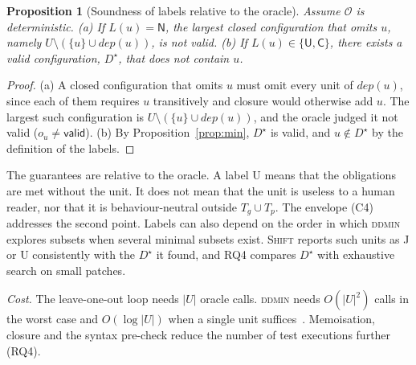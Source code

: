 \documentclass[a4paper,fleqn]{cas-sc}
\newcommand{\tool}{\textsc{Shift}}
\newcommand{\lab}[1]{\textsf{#1}}
\newtheorem{proposition}{Proposition}
\begin{document}
\begin{proposition}[Soundness of labels relative to the oracle]\label{prop:sound}
Assume $\mathcal{O}$ is deterministic. (a) If $L(u)=\lab{N}$, the largest closed configuration that omits $u$, namely $U\setminus(\{u\}\cup\mathit{dep}(u))$, is not valid. (b) If $L(u)\in\{\lab{U},\lab{C}\}$, there exists a valid configuration, $D^\star$, that does not contain $u$.
\end{proposition}
\begin{proof}
(a) A closed configuration that omits $u$ must omit every unit of $\mathit{dep}(u)$, since each of them requires $u$ transitively and closure would otherwise add $u$. The largest such configuration is $U\setminus(\{u\}\cup\mathit{dep}(u))$, and the oracle judged it not valid ($o_u\neq\lab{valid}$). (b) By Proposition~\ref{prop:min}, $D^\star$ is valid, and $u\notin D^\star$ by the definition of the labels.
\end{proof}


The guarantees are relative to the oracle. A label \lab{U} means that the obligations are met without the unit. It does not mean that the unit is useless to a human reader, nor that it is behaviour-neutral outside $T_g\cup T_p$. The envelope (C4) addresses the second point. Labels can also depend on the order in which \textsc{ddmin} explores subsets when several minimal subsets exist. \tool{} reports such units as \lab{J} or \lab{U} consistently with the $D^\star$ it found, and RQ4 compares $D^\star$ with exhaustive search on small patches.

\emph{Cost.} The leave-one-out loop needs $|U|$ oracle calls. \textsc{ddmin} needs $O(|U|^2)$ calls in the worst case and $O(\log |U|)$ when a single unit suffices~\citep{zeller2002ddmin}. Memoisation, closure and the syntax pre-check reduce the number of test executions further (RQ4).
\end{document}

